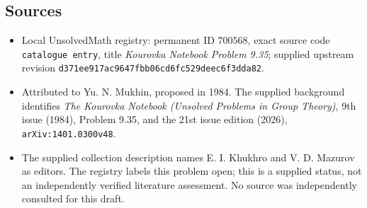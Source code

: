 \documentclass[11pt]{article}
\begin{document}
\subsection{Sources}
\begin{itemize}
\item Local UnsolvedMath registry: permanent ID \(700568\), exact source code \texttt{catalogue entry}, title \emph{Kourovka Notebook Problem 9.35}; supplied upstream revision \texttt{d371ee917ac9647fbb06cd6fc529deec6f3dda82}.
\item Attributed to Yu. N. Mukhin, proposed in 1984. The supplied background identifies \emph{The Kourovka Notebook (Unsolved Problems in Group Theory)}, 9th issue (1984), Problem 9.35, and the 21st issue edition (2026), \texttt{arXiv:1401.0300v48}.
\item The supplied collection description names E. I. Khukhro and V. D. Mazurov as editors. The registry labels this problem open; this is a supplied status, not an independently verified literature assessment. No source was independently consulted for this draft.
\end{itemize}
\end{document}
